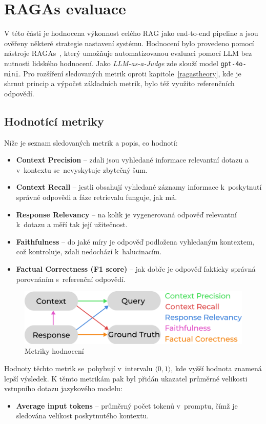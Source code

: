 \section{RAGAs evaluace}
\label{ragas_eval}
V této části je hodnocena výkonnost celého RAG jako end-to-end pipeline a jsou ověřeny některé strategie nastavení systému. Hodnocení bylo provedeno pomocí nástroje RAGAs~\cite{ragas}, který umožňuje automatizovanou evaluaci pomocí LLM bez nutnosti lidského hodnocení. Jako \textit{LLM-as-a-Judge} zde slouží model \texttt{gpt-4o-mini}. Pro rozšíření sledovaných metrik oproti kapitole~\ref{ragastheory}, kde je shrnut princip a výpočet základních metrik, bylo též využito referenčních odpovědí.

\subsection{Hodnotící metriky}
Níže je seznam sledovaných metrik a popis, co hodnotí:
\begin{itemize}
    \item \textbf{Context Precision} – zdali jsou vyhledané informace relevantní dotazu a v~kontextu se~nevyskytuje zbytečný šum.
    \item \textbf{Context Recall} – jestli obsahují vyhledané záznamy informace k~poskytnutí správné odpovědi a fáze retrievalu funguje, jak má.
    \item \textbf{Response Relevancy} – na kolik je vygenerovaná odpověď relevantní k~dotazu a měří tak její užitečnost.
    \item \textbf{Faithfulness} – do jaké míry je odpověď podložena vyhledaným kontextem, což kontroluje, zdali nedochází k~halucinacím.
    \item \textbf{Factual Correctness (F1 score)} – jak dobře je odpověď fakticky správná porovnáním s~referenční odpovědí.
\end{itemize}

\begin{figure}[H]
    \centering
    \includegraphics[width=0.7\linewidth]{obrazky/ragas_eval.pdf}
    \caption{Metriky hodnocení}
    \label{fig:metrics}
\end{figure}


Hodnoty těchto metrik se~pohybují v~intervalu $\langle 0, 1 \rangle$, kde vyšší hodnota znamená lepší výsledek. K těmto metrikám pak byl přidán ukazatel průměrné velikosti vstupního dotazu jazykového modelu:
\begin{itemize}
    \item \textbf{Average input tokens} – průměrný počet tokenů v~promptu, čímž je sledována velikost poskytnutého kontextu.
\end{itemize}

